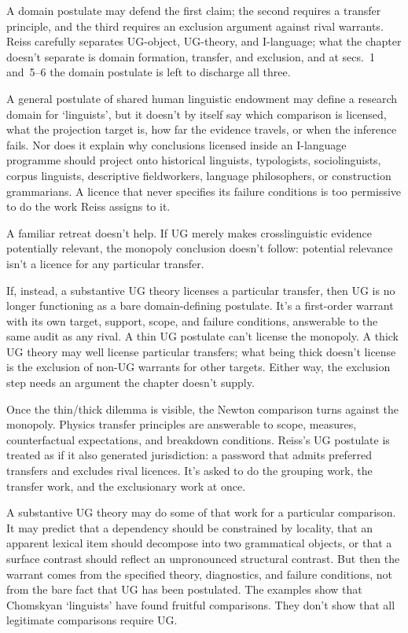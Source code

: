 \documentclass[12pt]{article}
\begin{document}
A domain postulate may defend the first claim; the second requires a transfer principle, and the third requires an exclusion argument against rival warrants. Reiss carefully separates UG-object, UG-theory, and I-language; what the chapter doesn't separate is domain formation, transfer, and exclusion, and at secs.~1 and~5--6 the domain postulate is left to discharge all three.

A general postulate of shared human linguistic endowment may define a research domain for `linguists', but it doesn't by itself say which comparison is licensed, what the projection target is, how far the evidence travels, or when the inference fails. Nor does it explain why conclusions licensed inside an I-language programme should project onto historical linguists, typologists, sociolinguists, corpus linguists, descriptive fieldworkers, language philosophers, or construction grammarians. A licence that never specifies its failure conditions is too permissive to do the work Reiss assigns to it.

A familiar retreat doesn't help. If UG merely makes crosslinguistic evidence potentially relevant, the monopoly conclusion doesn't follow: potential relevance isn't a licence for any particular transfer.

If, instead, a substantive UG theory licenses a particular transfer, then UG is no longer functioning as a bare domain-defining postulate. It's a first-order warrant with its own target, support, scope, and failure conditions, answerable to the same audit as any rival. A thin UG postulate can't license the monopoly. A thick UG theory may well license particular transfers; what being thick doesn't license is the exclusion of non-UG warrants for other targets. Either way, the exclusion step needs an argument the chapter doesn't supply.

Once the thin/thick dilemma is visible, the Newton comparison turns against the monopoly. Physics transfer principles are answerable to scope, measures, counterfactual expectations, and breakdown conditions. Reiss's UG postulate is treated as if it also generated jurisdiction: a password that admits preferred transfers and excludes rival licences. It's asked to do the grouping work, the transfer work, and the exclusionary work at once.

A substantive UG theory may do some of that work for a particular comparison. It may predict that a dependency should be constrained by locality, that an apparent lexical item should decompose into two grammatical objects, or that a surface contrast should reflect an unpronounced structural contrast. But then the warrant comes from the specified theory, diagnostics, and failure conditions, not from the bare fact that UG has been postulated. The examples show that Chomskyan `linguists' have found fruitful comparisons. They don't show that all legitimate comparisons require UG.
\end{document}
